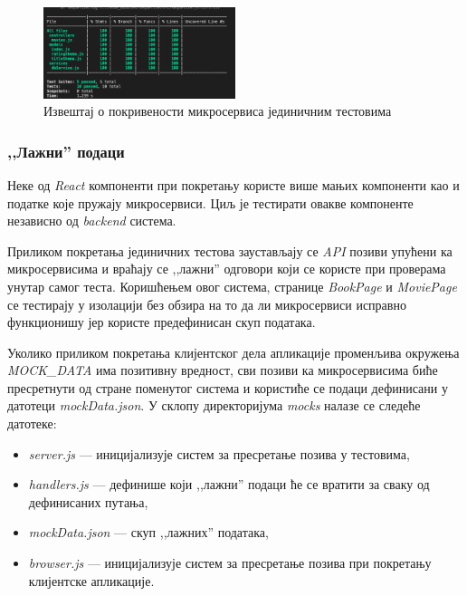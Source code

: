 \documentclass[12pt,oneside]{memoir}
\begin{document}
\begin{figure}[!ht]
  \centering
  \includegraphics[width=0.5\textwidth]{matfmaster/img/coverage.png}
  \caption{Извештај о покривености микросервиса јединичним тестовима}
  \label{fig:pokrivenost}
\end{figure}


\subsubsection{,,Лажни” подаци}

Неке од \textit{React} компоненти при покретању користе више мањих компоненти као и податке које пружају микросервиси. Циљ је тестирати овакве компоненте независно од \textit{backend} система.

Приликом покретања јединичних тестова заустављају се \textit{API} позиви упућени ка микросервисима и враћају се ,,лажни” одговори који се користе при проверама унутар самог теста.  Коришћењем овог система, странице \textit{BookPage} и \textit{MoviePage} се тестирају  у изолацији без обзира на то да ли микросервиси исправно функционишу јер користе предефинисан скуп података.

Уколико приликом покретања клијентског дела апликације променљива окружења \textit{MOCK\_DATA} има позитивну вредност, сви позиви ка микросервисима биће пресретнути од стране поменутог система и користиће се подаци дефинисани у датотеци \textit{mockData.json}. У склопу директоријума \textit{mocks} налазе се следеће датотеке:

\begin{itemize}
\item \textit{server.js} --- иницијализује систем за пресретање позива у тестовима,
\item \textit{handlers.js} --- дефинише који ,,лажни” подаци ће се вратити за сваку од дефинисаних путања,
\item \textit{mockData.json} --- скуп ,,лажних” података,
\item \textit{browser.js} --- иницијализује систем за пресретање позива при покретању клијентске апликације.
\end{itemize}
\end{document}
